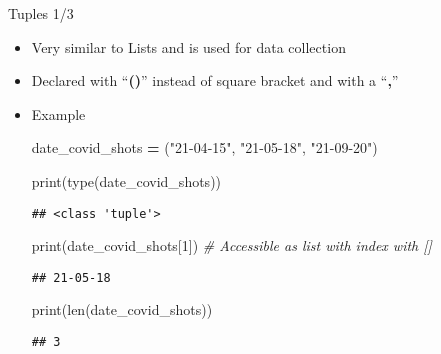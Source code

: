 \documentclass[
  8pt,
  ignorenonframetext,
]{beamer}
\newenvironment{Shaded}{\begin{snugshade}}{\end{snugshade}}
\newcommand{\BuiltInTok}[1]{#1}
\newcommand{\CommentTok}[1]{\textcolor[rgb]{0.56,0.35,0.01}{\textit{#1}}}
\newcommand{\DecValTok}[1]{\textcolor[rgb]{0.00,0.00,0.81}{#1}}
\newcommand{\NormalTok}[1]{#1}
\newcommand{\OperatorTok}[1]{\textcolor[rgb]{0.81,0.36,0.00}{\textbf{#1}}}
\newcommand{\StringTok}[1]{\textcolor[rgb]{0.31,0.60,0.02}{#1}}
\providecommand{\tightlist}{%
  \setlength{\itemsep}{0pt}\setlength{\parskip}{0pt}}
\begin{document}
\begin{frame}[fragile]{Tuples 1/3}
\protect\hypertarget{tuples-13}{}
\begin{itemize}[<+->]
\tightlist
\item
  Very similar to Lists and is used for data collection
\end{itemize}

\begin{itemize}[<+->]
\tightlist
\item
  Declared with ``\textbf{()}'' instead of square bracket and with a
  ``\textbf{,}''
\end{itemize}

\begin{itemize}[<+->]
\item
  Example

\begin{Shaded}
\begin{Highlighting}[]
\NormalTok{date\_covid\_shots }\OperatorTok{=}\NormalTok{ (}\StringTok{"21{-}04{-}15"}\NormalTok{, }\StringTok{"21{-}05{-}18"}\NormalTok{, }\StringTok{"21{-}09{-}20"}\NormalTok{)}

\BuiltInTok{print}\NormalTok{(}\BuiltInTok{type}\NormalTok{(date\_covid\_shots))}
\end{Highlighting}
\end{Shaded}

\begin{verbatim}
## <class 'tuple'>
\end{verbatim}

\begin{Shaded}
\begin{Highlighting}[]
\BuiltInTok{print}\NormalTok{(date\_covid\_shots[}\DecValTok{1}\NormalTok{])  }\CommentTok{\# Accessible as list with index with []}
\end{Highlighting}
\end{Shaded}

\begin{verbatim}
## 21-05-18
\end{verbatim}

\begin{Shaded}
\begin{Highlighting}[]
\BuiltInTok{print}\NormalTok{(}\BuiltInTok{len}\NormalTok{(date\_covid\_shots))}
\end{Highlighting}
\end{Shaded}

\begin{verbatim}
## 3
\end{verbatim}
\end{itemize}
\end{frame}
\end{document}
